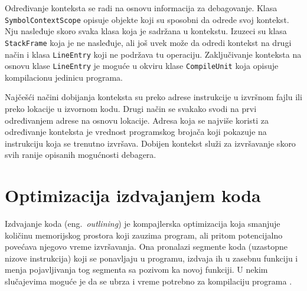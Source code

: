 \documentclass[12pt,oneside]{memoir}
\begin{document}
Određivanje konteksta se radi na osnovu informacija za debagovanje.
Klasa \verb|SymbolContextScope| opisuje objekte koji su sposobni da odrede svoj kontekst.
Nju nasleđuje skoro svaka klasa koja je sadržana u kontekstu.
Izuzeci su klasa \verb|StackFrame| koja je ne nasleđuje, ali još uvek može da odredi kontekst na drugi način i klasa \verb|LineEntry| koji ne podržava tu operaciju.
Zaključivanje konteksta na osnovu klase \verb|LineEntry| je moguće u okviru klase \verb|CompileUnit| koja opisuje kompilacionu jedinicu programa.

Najčešći načini dobijanja konteksta su preko adrese instrukcije u izvršnom fajlu ili preko lokacije u izvornom kodu.
Drugi način se svakako svodi na prvi određivanjem adrese na osnovu lokacije.
Adresa koja se najviše koristi za određivanje konteksta je vrednost programskog brojača koji pokazuje na instrukciju koja se trenutno izvršava.
Dobijen kontekst služi za izvršavanje skoro svih ranije opisanih mogućnosti debagera.


\chapter{Optimizacija izdvajanjem koda}
\label{sec:outlining}



Izdvajanje koda (eng.~{\em outlining}) je kompajlerska optimizacija koja smanjuje količinu memorijskog prostora koji zauzima program, ali pritom potencijalno povećava njegovo vreme izvršavanja.
Ona pronalazi segmente koda (uzastopne nizove instrukcija) koji se ponavljaju u programu, izdvaja ih u zasebnu funkciju i menja pojavljivanja tog segmenta sa pozivom ka novoj funkciji.
U nekim slučajevima moguće je da se ubrza i vreme potrebno za kompilaciju programa \cite{grune2012design}.
\end{document}
